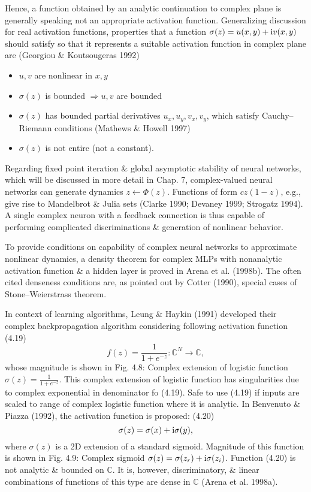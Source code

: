 \documentclass{article}
\begin{document}
\begin{enumerate}
\begin{itemize}
\begin{itemize}
			Hence, a function obtained by an analytic continuation to complex plane is generally speaking not an appropriate activation function. Generalizing discussion for real activation functions, properties that a function $\sigma(z) = u(x,y) + {\rm i}v(x,y)$ should satisfy so that it represents a suitable activation function in complex plane are (Georgiou \& Koutsougeras 1992)
			\begin{itemize}
				\item $u,v$ are nonlinear in $x,y$
				\item $\sigma(z)$ is bounded $\Rightarrow u,v$ are bounded
				\item $\sigma(z)$ has bounded partial derivatives $u_x,u_y,v_x,v_y$, which satisfy Cauchy--Riemann conditions (Mathews \& Howell 1997)
				\item $\sigma(z)$ is not entire (not a constant).
			\end{itemize}
			Regarding fixed point iteration \& global asymptotic stability of neural networks, which will be discussed in more detail in Chap. 7, complex-valued neural networks can generate dynamics $z\leftarrow\Phi(z)$. Functions of form $cz(1 - z)$, e.g., give rise to Mandelbrot \& Julia sets (Clarke 1990; Devaney 1999; Strogatz 1994). A single complex neuron with a feedback connection is thus capable of performing complicated discriminations \& generation of nonlinear behavior.
			
			To provide conditions on capability of complex neural networks to approximate nonlinear dynamics, a density theorem for complex MLPs with nonanalytic activation function \& a hidden layer is proved in Arena et al. (1998b). The often cited denseness conditions are, as pointed out by Cotter (1990), special cases of Stone--Weierstrass theorem.
			
			In context of learning algorithms, Leung \& Haykin (1991) developed their complex backpropagation algorithm considering following activation function (4.19)
			\begin{equation}
				f(z) = \frac{1}{1 + e^{-z}}:\mathbb{C}^N\to\mathbb{C},
			\end{equation}
			whose magnitude is shown in {\sf Fig. 4.8: Complex extension of logistic function $\sigma(z) = \frac{1}{1 + e^{-z}}$}. This complex extension of logistic function has singularities due to complex exponential in denominator fo (4.19). Safe to use (4.19) if inputs are scaled to range of complex logistic function where it is analytic. In Benvenuto \& Piazza (1992), the activation function is proposed: (4.20)
			\begin{equation}
				\sigma(z) = \sigma(x) + {\rm i}\sigma(y),
			\end{equation}
			where $\sigma(z)$ is a 2D extension of a standard sigmoid. Magnitude of this function is shown in {\sf Fig. 4.9: Complex sigmoid $\sigma(z) = \sigma(z_r) + {\rm i}\sigma(z_i)$}. Function (4.20) is not analytic \& bounded on $\mathbb{C}$. It is, however, discriminatory, \& linear combinations of functions of this type are dense in $\mathbb{C}$ (Arena et al. 1998a).
			

\end{itemize}
\end{itemize}
\end{enumerate}
\end{document}
